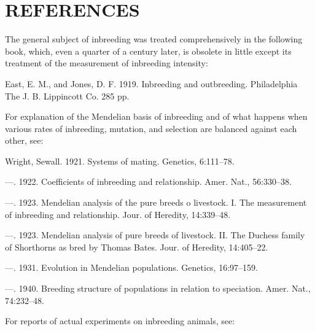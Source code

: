 \section*{REFERENCES}

The general subject of inbreeding was treated comprehensively in
the following book, which, even a quarter of a century later, is obsolete
in little except its treatment of the measurement of inbreeding
intensity:

\begin{hangparas}{0.5in}{1}%
East, E. M., and Jones, D. F. 1919. Inbreeding and outbreeding. Philadelphia The
J. B. Lippincott Co. 285 pp.
\end{hangparas}

For explanation of the Mendelian basis of inbreeding and of what
happens when various rates of inbreeding, mutation, and selection are
balanced against each other, see:

\begin{hangparas}{0.5in}{1}%
Wright, Sewall. 1921. Systems of mating. Genetics, 6:111--78.

---. 1922. Coefficients of inbreeding and relationship. Amer. Nat., 56:330--38.

---. 1923. Mendelian analysis of the pure breeds o livestock. I. The measurement
of inbreeding and relationship. Jour. of Heredity, 14:339--48.

---. 1923. Mendelian analysis of pure breeds of livestock. II. The Duchess
family of Shorthorns as bred by Thomas Bates. Jour. of Heredity, 14:405--22.

---. 1931. Evolution in Mendelian populations. Genetics, 16:97--159.

---. 1940. Breeding structure of populations in relation to speciation. Amer.
Nat., 74:232--48.
\end{hangparas}

For reports of actual experiments on inbreeding animals, see:

